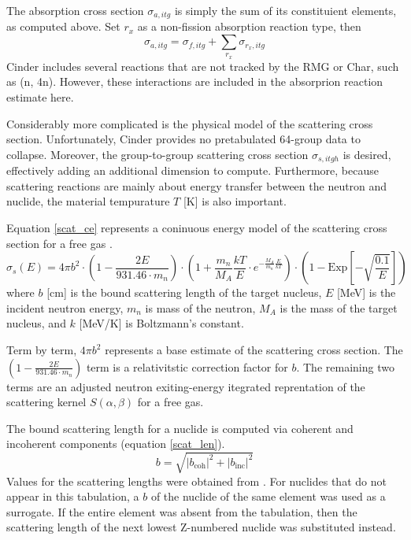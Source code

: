 The absorption cross section $\sigma_{a,itg}$ is simply the sum of its constituient elements, as 
computed above.  Set $r_x$ as a non-fission absorption reaction type, then
\begin{equation}
\label{sig_a_model}
\sigma_{a,itg} = \sigma_{f,itg} + \sum_{r_x} \sigma_{r_x,itg}
\end{equation}
Cinder includes several reactions that are not tracked by the RMG or Char, such as (n, 4n). 
However, these interactions are included in the absorprion reaction estimate here.  

Considerably more complicated is the physical model of the scattering cross section.  Unfortunately, 
Cinder provides no pretabulated 64-group data to collapse.  Moreover, the group-to-group scattering
cross section $\sigma_{s,itgh}$ is desired, effectively adding an additional dimension to compute.
Furthermore, because scattering reactions are mainly about energy transfer between the neutron and 
nuclide, the material tempurature $T$ [K] is also important.

Equation \ref{scat_ce} represents a coninuous energy model of the scattering cross section for a free gas
\cite{Yamamoto2006, Mattes2005}.
\begin{equation}
\label{scat_ce}
\sigma_s(E) = 4 \pi b^2 \cdot \left(1 - \frac{2E}{931.46 \cdot m_n}\right) \cdot
              \left(1 + \frac{m_n}{M_A} \frac{kT}{E} \cdot e^{-\frac{M_A}{m_n}\frac{E}{kT}}\right) 
              \cdot \left(1 - \mbox{Exp}\left[-\sqrt{\frac{0.1}{E}}\right]\right)
\end{equation}
where $b$ [cm] is the bound scattering length of the target nucleus, $E$ [MeV] is the incident
neutron energy, $m_n$ is mass of the neutron, $M_A$ is the mass of the target nucleus, and
$k$ [MeV/K] is Boltzmann's constant.

Term by term, $4 \pi b^2$ represents a base estimate of the scattering cross section.  
The $\left(1 - \frac{2E}{931.46 \cdot m_n}\right)$ term is a relativitstic correction
factor for $b$.  The remaining two terms are an adjusted neutron exiting-energy itegrated 
reprentation of the scattering kernel $S(\alpha, \beta)$ for a free gas.

The bound scattering length for a nuclide is computed via coherent and incoherent components
(equation \ref{scat_len}).
\begin{equation}
\label{scat_len}
b = \sqrt{\left| b_{\mbox{coh}} \right|^2 + \left| b_{\mbox{inc}} \right|^2}
\end{equation}
Values for the scattering lengths were obtained from \cite{Sears1992}.  For nuclides
that do not appear in this tabulation, a $b$ of the nuclide of the same element was
used as a surrogate.  If the entire element was absent from the tabulation, then the 
scattering length of the next lowest Z-numbered nuclide was substituted instead.

